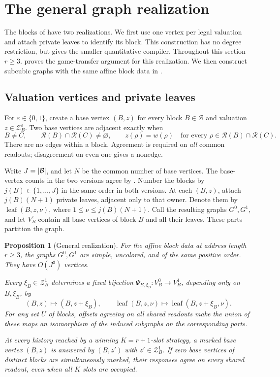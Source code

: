 \documentclass[11pt]{article}
\newtheorem{proposition}[theorem]{Proposition}
\theoremstyle{definition}
\newcommand{\cB}{\mathcal B}
\newcommand{\cR}{\mathcal R}
\newcommand{\cZ}{\mathcal Z}
\newcommand{\eps}{\varepsilon}
\DeclarePairedDelimiter{\abs}{\lvert}{\rvert}
\begin{document}
\section{The general graph realization}\label{general:section}

The blocks of  have two realizations. We first use
one vertex per legal valuation and attach private leaves to identify
its block. This construction has no degree restriction, but gives the
smaller quantitative compiler. Throughout this section \(r\ge3\).
 proves the game-transfer argument for this
realization. We then construct subcubic graphs with the same affine block
data in .

\subsection{Valuation vertices and private leaves}

For \(\eps\in\{0,1\}\), create a base vertex \((B,z)\) for every
block \(B\in\cB\) and valuation \(z\in\cZ_B^\eps\). Two base vertices
are adjacent exactly when
\begin{equation}\label{general:adjacency}
 B\ne C,\qquad
 \cR(B)\cap\cR(C)\ne\varnothing,\qquad
 z(\rho)=w(\rho)\quad
 \text{for every }\rho\in\cR(B)\cap\cR(C).
\end{equation}
There are no edges within a block. Agreement is required on
\emph{all} common readouts; disagreement on even one gives a nonedge.

Write \(J=\abs{\cB}\), and let \(N\) be the common number of base
vertices. The base-vertex counts in the two versions agree by
.
Number the blocks by \(j(B)\in\{1,\ldots,J\}\) in the same order
in both versions. At each \((B,z)\), attach \(j(B)(N+1)\) private
leaves, adjacent only to that owner. Denote them by
\(\operatorname{leaf}(B,z,\nu)\), where
\(1\le\nu\le j(B)(N+1)\). Call the resulting graphs \(G^0,G^1\),
and let \(V_B^\eps\) contain all base vertices of block \(B\) and
all their leaves. These parts partition the graph.

\begin{proposition}[General realization]\label{prop:general-realization}
For the affine block data at address length \(r\ge3\), the graphs
\(G^0,G^1\) are simple, uncolored, and of the same positive order.
They have \(O(J^3)\) vertices.

Every \(\xi_B\in\cZ_B^1\) determines a fixed bijection
\(\Psi_{B,\xi_B}:V_B^0\to V_B^1\), depending only on \(B,\xi_B\),
by
\[
 (B,z)\longmapsto(B,z+\xi_B),\qquad
 \operatorname{leaf}(B,z,\nu)\longmapsto
 \operatorname{leaf}(B,z+\xi_B,\nu).
\]
For any set \(U\) of blocks, offsets agreeing on all shared readouts
make the union of these maps an isomorphism of the induced subgraphs
on the corresponding parts.

At every history reached by a winning \(K=r+1\)-slot strategy,
a marked base vertex \((B,z)\) is answered by \((B,z')\) with
\(z'\in\cZ_B^1\). If zero base vertices of distinct blocks are
simultaneously marked, their responses agree on every shared
readout, even when all \(K\) slots are occupied.
\end{proposition}
\end{document}
